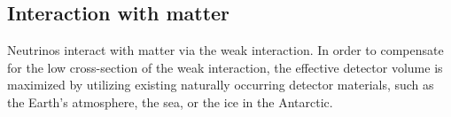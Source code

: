 \cite{neutrinos_beacom}


\subsection{Interaction with matter}
Neutrinos interact with matter via the weak interaction.
In order to compensate for the low cross-section of the weak interaction,
  the effective detector volume is maximized by utilizing existing naturally occurring detector materials,
  such as
    the Earth's atmosphere,
    the sea,
    or the ice in the Antarctic.

